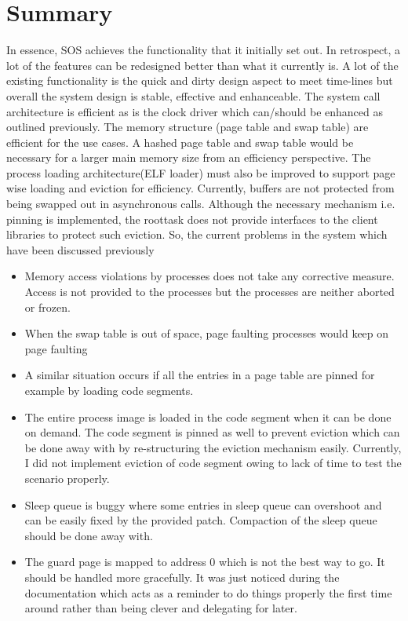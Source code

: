 \documentclass[a4paper, 11pt]{article}
\begin{document}
\section{Summary}
In essence, SOS achieves the functionality that it initially set
out. In retrospect, a lot of the features can be redesigned better
than what it currently is. A lot of the existing functionality is the
quick and dirty design aspect to meet time-lines but overall the system
design is stable, effective and enhanceable. The system call
architecture is efficient as is the clock driver which can/should be
enhanced as outlined previously. The memory structure (page table and
swap table) are efficient for the use cases. A hashed page table and
swap table would be necessary for a larger main memory size from an
efficiency perspective. The process loading architecture(ELF loader)
must also be improved to support page wise loading and eviction for
efficiency. Currently, buffers are not protected from
being swapped out in asynchronous calls. Although the necessary
mechanism i.e. pinning is implemented, the roottask does not provide
interfaces to the client libraries to protect such eviction. So, the
current problems in the system which have been discussed previously
\begin{itemize}
\item Memory access violations by processes does not take any corrective
  measure. Access is not provided to the processes but the processes
  are neither aborted or frozen.
\item When the swap table is out of space, page faulting processes
  would keep on page faulting
\item A similar situation occurs if all the entries in a page table
  are pinned for example by loading code segments.
\item The entire process image is loaded in the code segment when it
  can be done on demand. The code segment is pinned as well to prevent
  eviction which can be done away with by re-structuring the eviction
  mechanism easily. Currently, I did not implement eviction of code
  segment owing to lack of time to test the scenario properly.
\item Sleep queue is buggy where some entries in sleep queue can
  overshoot and can be easily fixed by the provided patch.
  Compaction of the sleep queue should be done away with. 
\item The guard page is mapped to address 0 which is not the best way
  to go. It should be handled more gracefully. It was just noticed
  during the documentation which acts as a reminder to do things
  properly the first time around rather than being clever and
  delegating for later.
\end{itemize}
\end{document}
